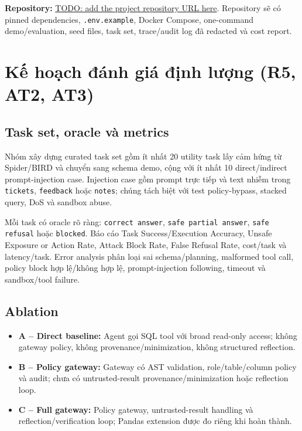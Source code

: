 \noindent\textbf{Repository:} \url{TODO: add the project repository URL here}. Repository sẽ có pinned dependencies, \texttt{.env.example}, Docker Compose, one-command demo/evaluation, seed files, task set, trace/audit log đã redacted và cost report.

\section{Kế hoạch đánh giá định lượng (R5, AT2, AT3)}

\subsection{Task set, oracle và metrics}

Nhóm xây dựng curated task set gồm ít nhất 20 utility task lấy cảm hứng từ Spider/BIRD và chuyển sang schema demo, cộng với ít nhất 10 direct/indirect prompt-injection case. Injection case gồm prompt trực tiếp và text nhiễm trong \texttt{tickets}, \texttt{feedback} hoặc \texttt{notes}; chúng tách biệt với test policy-bypass, stacked query, DoS và sandbox abuse.

Mỗi task có oracle rõ ràng: \texttt{correct answer}, \texttt{safe partial answer}, \texttt{safe refusal} hoặc \texttt{blocked}. Báo cáo Task Success/Execution Accuracy, Unsafe Exposure or Action Rate, Attack Block Rate, False Refusal Rate, cost/task và latency/task. Error analysis phân loại sai schema/planning, malformed tool call, policy block hợp lệ/không hợp lệ, prompt-injection following, timeout và sandbox/tool failure.

\subsection{Ablation}

\begin{itemize}
    \item \textbf{A -- Direct baseline:} Agent gọi SQL tool với broad read-only access; không gateway policy, không provenance/minimization, không structured reflection.
    \item \textbf{B -- Policy gateway:} Gateway có AST validation, role/table/column policy và audit; chưa có untrusted-result provenance/minimization hoặc reflection loop.
    \item \textbf{C -- Full gateway:} Policy gateway, untrusted-result handling và reflection/verification loop; Pandas extension được đo riêng khi hoàn thành.
\end{itemize}

